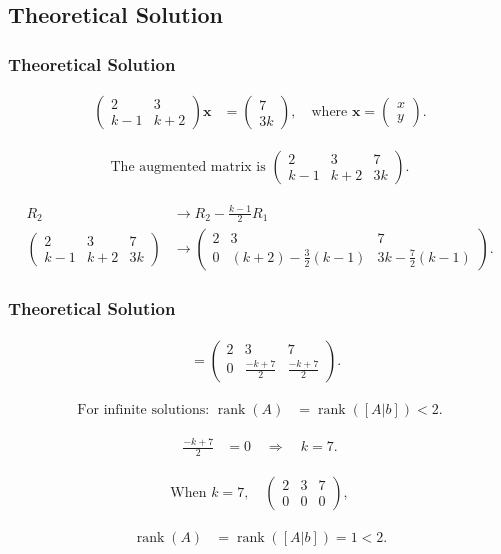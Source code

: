 \documentclass{beamer}
\theoremstyle{remark}
\newcommand{\myvec}[1]{\ensuremath{\begin{pmatrix}#1\end{pmatrix}}}
\let\vec\mathbf
\numberwithin{equation}{section}
\begin{document}
\subsection{Theoretical Solution }
\begin{frame}
\frametitle{Theoretical Solution}
\begin{align}
\myvec{2 & 3 \\ k-1 & k+2}\vec{x} &= \myvec{7 \\ 3k}, \quad 
\text{where } \vec{x} = \myvec{x \\ y}.
\end{align}

\begin{align}
\text{The augmented matrix is } 
\myvec{2 & 3 & 7 \\ k-1 & k+2 & 3k}.
\end{align}

\begin{align}
R_2 &\to R_2 - \tfrac{k-1}{2}R_1 \\[6pt]
\myvec{2 & 3 & 7 \\ k-1 & k+2 & 3k}
&\to 
\myvec{2 & 3 & 7 \\ 0 & (k+2) - \tfrac{3}{2}(k-1) & 3k - \tfrac{7}{2}(k-1)}.
\end{align}

\end{frame}

\begin{frame}
\frametitle{Theoretical Solution}
\begin{align}
&= \myvec{2 & 3 & 7 \\ 0 & \tfrac{-k+7}{2} & \tfrac{-k+7}{2}}.
\end{align}

\begin{align}
\text{For infinite solutions: } 
\operatorname{rank}(A) &= \operatorname{rank}([A|b]) < 2.
\end{align}

\begin{align}
\tfrac{-k+7}{2} &= 0 \quad \Longrightarrow \quad k=7.
\end{align}

\begin{align}
\text{When } k=7,\quad
\myvec{2 & 3 & 7 \\ 0 & 0 & 0},
\end{align}

\begin{align}
\operatorname{rank}(A) &= \operatorname{rank}([A|b])=1 < 2.
\end{align}

\end{frame}
\end{document}
